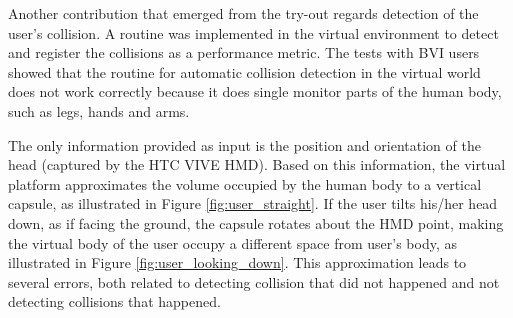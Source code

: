        Another contribution that emerged from the try-out regards detection of the user's collision. A routine was implemented in the virtual environment to detect and register the collisions as a performance metric. The tests with BVI users showed that the routine for automatic collision detection in the virtual world does not work correctly because it does single monitor parts of the human body, such as legs, hands and arms. 

        The only information provided as input is the position and orientation of the head (captured by the HTC VIVE HMD). Based on this information, the virtual platform approximates the volume occupied by the human body to a vertical capsule, as illustrated in Figure \ref{fig:user_straight}. If the user tilts his/her head down, as if facing the ground, the capsule rotates about the HMD point, making the virtual body of the user occupy a different space from user's body, as illustrated in Figure \ref{fig:user_looking_down}. This approximation leads to several errors, both related to detecting collision that did not happened and not detecting collisions that happened.

